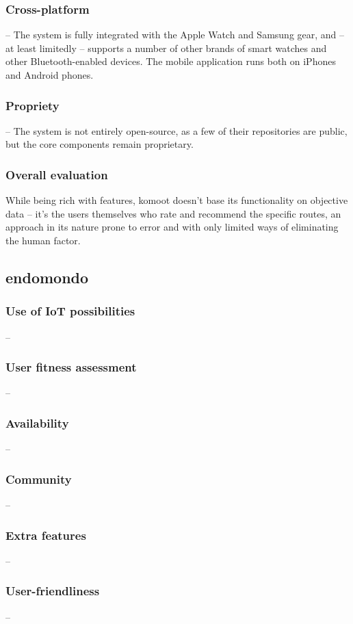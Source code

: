 \subsubsection*{Cross-platform} -- The system is fully integrated with the Apple Watch and Samsung gear, and -- at least limitedly -- supports a number of other brands of smart watches and other Bluetooth-enabled devices.
The mobile application runs both on iPhones and Android phones.
\subsubsection*{Propriety} -- The system is not entirely open-source, as a few of their repositories are public, but the core components remain proprietary. 

\subsubsection*{Overall evaluation}
While being rich with features, komoot doesn't base its functionality on objective data -- it's the users themselves who rate and recommend the specific routes,
an approach in its nature prone to error and with only limited ways of eliminating the human factor.

\subsection{endomondo}

\subsubsection*{Use of IoT possibilities} --
\subsubsection*{User fitness assessment} --
\subsubsection*{Availability} --
\subsubsection*{Community} -- 
\subsubsection*{Extra features} -- 
\subsubsection*{User-friendliness} -- 
